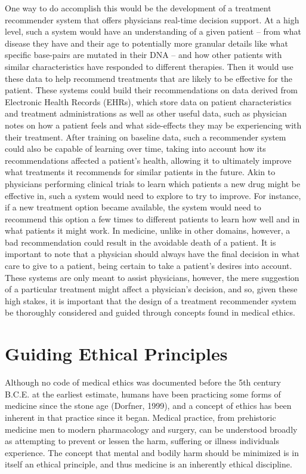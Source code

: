 \documentclass[]{spie}  %
\begin{document}
One way to do accomplish this would be the development of a treatment recommender system that offers physicians real-time decision support. At a high level, such a system would have an understanding of a given patient -- from what disease they have and their age to potentially more granular details like what specific base-pairs are mutated in their DNA -- and how other patients with similar characteristics have responded to different therapies. Then it would use these data to help recommend treatments that are likely to be effective for the patient. These systems could build their recommendations on data derived from Electronic Health Records (EHRs), which store data on patient characteristics and treatment administrations as well as other useful data, such as physician notes on how a patient feels and what side-effects they may be experiencing with their treatment. After training on baseline data, such a recommender system could also be capable of learning over time, taking into account how its recommendations affected a patient’s health, allowing it to ultimately improve what treatments it recommends for similar patients in the future. Akin to physicians performing clinical trials to learn which patients a new drug might be effective in, such a system would need to explore to try to improve. For instance, if a new treatment option became available, the system would need to recommend this option a few times to different patients to learn how well and in what patients it might work. In medicine, unlike in other domains, however, a bad recommendation could result in the avoidable death of a patient. It is important to note that a physician should always have the final decision in what care to give to a patient, being certain to take a patient’s desires into account. These systems are only meant to assist physicians, however, the mere suggestion of a particular treatment might affect a physician's decision, and so, given these high stakes, it is important that the design of a treatment recommender system be thoroughly considered and guided through concepts found in medical ethics.

\section{Guiding Ethical Principles}

Although no code of medical ethics was documented before the 5th century B.C.E. at the earliest estimate, humans have been practicing some forms of medicine since the stone age (Dorfner, 1999), and a concept of ethics has been inherent in that practice since it began. Medical practice, from prehistoric medicine men to modern pharmacology and surgery, can be understood broadly as attempting to prevent or lessen the harm, suffering or illness individuals experience. The concept that mental and bodily harm should be minimized is in itself an ethical principle, and thus medicine is an inherently ethical discipline.
\end{document}
